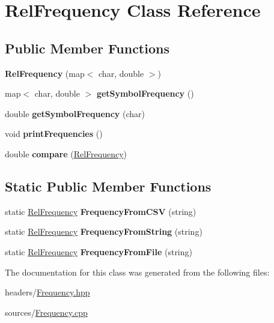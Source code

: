 \hypertarget{classRelFrequency}{}\section{Rel\+Frequency Class Reference}
\label{classRelFrequency}
\subsection*{Public Member Functions}
\begin{DoxyCompactItemize}
\item 
\mbox{\label{classRelFrequency_aee770cbb787b7ddb411d86286e173c54}} 
{\bfseries Rel\+Frequency} (map$<$ char, double $>$)
\item 
\mbox{\label{classRelFrequency_a34f54589602ae3d3358c4fc3c5ee715e}} 
map$<$ char, double $>$ {\bfseries get\+Symbol\+Frequency} ()
\item 
\mbox{\label{classRelFrequency_a4fbb38610164cf71b9f907a37e1ee799}} 
double {\bfseries get\+Symbol\+Frequency} (char)
\item 
\mbox{\label{classRelFrequency_aafe45f13cb37a2036a41ad63a7165b5d}} 
void {\bfseries print\+Frequencies} ()
\item 
\mbox{\label{classRelFrequency_a4a46dc5717a5e58dbdb15279f2d62607}} 
double {\bfseries compare} (\hyperlink{classRelFrequency}{Rel\+Frequency})
\end{DoxyCompactItemize}
\subsection*{Static Public Member Functions}
\begin{DoxyCompactItemize}
\item 
\mbox{\label{classRelFrequency_aeda20735e026cfa333b283d2d1242aad}} 
static \hyperlink{classRelFrequency}{Rel\+Frequency} {\bfseries Frequency\+From\+C\+SV} (string)
\item 
\mbox{\label{classRelFrequency_ad0ce5a278daab2b6582071e31bb6caac}} 
static \hyperlink{classRelFrequency}{Rel\+Frequency} {\bfseries Frequency\+From\+String} (string)
\item 
\mbox{\label{classRelFrequency_a43fcccc59922592eac3981a777841df4}} 
static \hyperlink{classRelFrequency}{Rel\+Frequency} {\bfseries Frequency\+From\+File} (string)
\end{DoxyCompactItemize}


The documentation for this class was generated from the following files\+:\begin{DoxyCompactItemize}
\item 
headers/\hyperlink{Frequency_8hpp}{Frequency.\+hpp}\item 
sources/\hyperlink{Frequency_8cpp}{Frequency.\+cpp}\end{DoxyCompactItemize}
